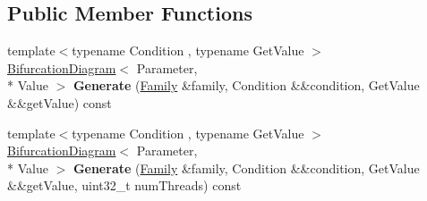 \subsection*{Public Member Functions}
\begin{DoxyCompactItemize}
\item 
\hypertarget{struct_d_r_d_s_p_1_1_bifurcation_diagram_generator_a2dad56c3f7336b5df29d06667c4e9142}{{\footnotesize template$<$typename Condition , typename Get\-Value $>$ }\\\hyperlink{struct_d_r_d_s_p_1_1_bifurcation_diagram}{Bifurcation\-Diagram}$<$ Parameter, \\*
Value $>$ {\bfseries Generate} (\hyperlink{struct_d_r_d_s_p_1_1_family}{Family} \&family, Condition \&\&condition, Get\-Value \&\&get\-Value) const }\label{struct_d_r_d_s_p_1_1_bifurcation_diagram_generator_a2dad56c3f7336b5df29d06667c4e9142}

\item 
\hypertarget{struct_d_r_d_s_p_1_1_bifurcation_diagram_generator_a07fa34c99d396ff21da37f75da1204ce}{{\footnotesize template$<$typename Condition , typename Get\-Value $>$ }\\\hyperlink{struct_d_r_d_s_p_1_1_bifurcation_diagram}{Bifurcation\-Diagram}$<$ Parameter, \\*
Value $>$ {\bfseries Generate} (\hyperlink{struct_d_r_d_s_p_1_1_family}{Family} \&family, Condition \&\&condition, Get\-Value \&\&get\-Value, uint32\-\_\-t num\-Threads) const }\label{struct_d_r_d_s_p_1_1_bifurcation_diagram_generator_a07fa34c99d396ff21da37f75da1204ce}

\end{DoxyCompactItemize}
